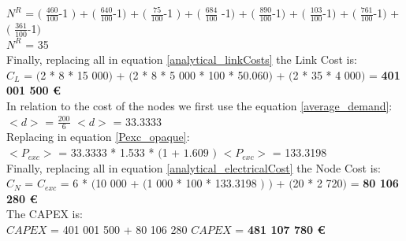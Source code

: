 $N^R$ = $($ $\frac{460}{100}$-1 $)$ + $($ $\frac{640}{100}$-1$)$ + $($ $\frac{75}{100}$-1 $)$ + $($ $\frac{684}{100}$ -1$)$ + $($ $\frac{890}{100}$-1$)$ + $($ $\frac{103}{100}$-1$)$ + $($ $\frac{761}{100}$-1$)$ + $($ $\frac{361}{100}$-1$)$\\

$N^R$ = 35\\

Finally, replacing all in equation \ref{analytical_linkCosts} the Link Cost is:\\

$C_L$ = $($2 * 8 * 15 000$)$ + $($2 * 8 * 5 000 * 100 * 50.060$)$ + $($2 * 35 * 4 000$)$ = \textbf{401 001 500 \euro}\\

In relation to the cost of the nodes we first use the equation \ref{average_demand}:\\

$<d>$ = $\frac{200}{6}$ \qquad \qquad $<d>$ = 33.3333\\

Replacing in equation \ref{Pexc_opaque}:\\

$<P_{exc}>$ = 33.3333 * 1.533 * $($1 + $1.609$ $)$ \qquad \qquad $<P_{exc}>$ = 133.3198 \\

Finally, replacing all in equation \ref{analytical_electricalCost} the Node Cost is:\\

$C_N$ = $C_{exc}$ = 6 * $($10 000 + $($1 000 * 100 * 133.3198 $)$ $)$ + $($20 * 2 720$)$ = \textbf{80 106 280 \euro}\\

The CAPEX is:\\

$CAPEX$ = 401 001 500 + 80 106 280 \qquad \qquad $CAPEX$ = \textbf{481 107 780 \euro}


